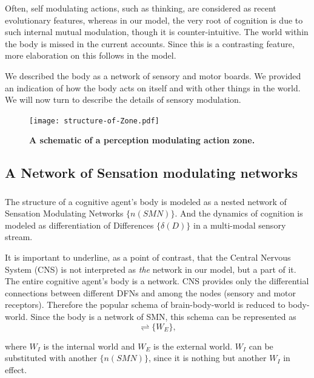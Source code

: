 Often, self modulating actions, such as thinking, are considered as recent evolutionary features, whereas in our model, the very root of cognition is due to such internal mutual modulation, though it is counter-intuitive. The world within the body is missed in the current accounts. Since this is a contrasting feature, more elaboration on this follows in the model.


We described the body as a network of sensory and motor boards. We provided an indication of how the body acts on itself and with other things in the world.  We will now turn to describe the details of sensory modulation. 

\begin{figure}[ht] 
\texttt{[image: structure-of-Zone.pdf]}
\caption{\color{Gray} \textbf{A schematic of a perception modulating action zone.}}
\label{zone} %
\end{figure}

\subsection{A Network of Sensation modulating networks}

\subsubsection{}

The structure of a cognitive agent's body is modeled as a nested network of Sensation Modulating Networks $\{n(SMN)\}$. And the dynamics of cognition is modeled as differentiation of Differences $\{\delta(D)\}$ in a  multi-modal sensory stream.

It is important to underline, as a point of contrast, that the Central Nervous System (CNS) is not interpreted as \textit{the} network in our model, but a part of it. The entire cognitive agent's body is a network. CNS provides only the differential connections between different DFNs and among the nodes (sensory and motor receptors). Therefore the popular schema of brain-body-world is reduced to body-world. Since the body is a network of SMN, this schema can be represented as 
\begin{equation}
[\{n(SMN)\}\rightleftharpoons \{W_I\}] \rightleftharpoons \{W_E\},
\end{equation}

where $W_I$ is the internal world and $W_E$ is the external world.  $W_I$ can be substituted with another $\{n(SMN)\}$, since it is nothing but another $W_I$ in effect. 


